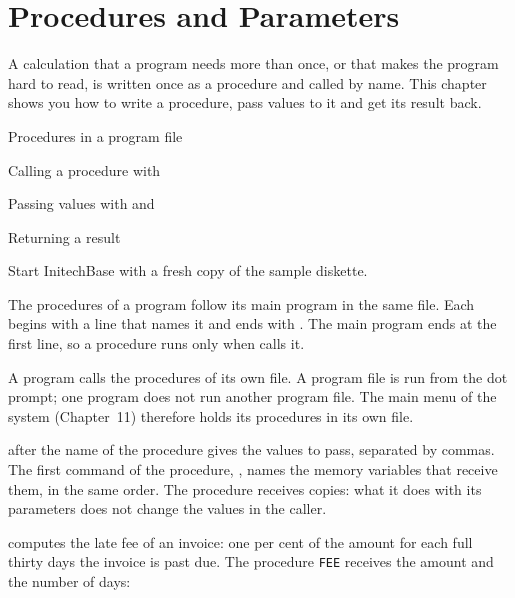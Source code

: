 \chapter{Procedures and Parameters}
A calculation that a program needs more than once, or that makes the program
hard to read, is written once as a procedure and called by name.  This chapter
shows you how to write a procedure, pass values to it and get its result back.

\begin{ChapterCovers}
\item Procedures in a program file
\item Calling a procedure with 
\item Passing values with  and 
\item Returning a result
\end{ChapterCovers}

Start InitechBase with a fresh copy of the sample diskette.

The procedures of a program follow its main program in the same file.  Each
begins with a  line that names it and ends with .
The main program ends at the first  line, so a procedure runs only
when  calls it.

A program calls the procedures of its own file.  A program file is run from the
dot prompt; one program does not run another program file.  The main menu of
the system (Chapter~11) therefore holds its procedures in its own file.

 after the name of the procedure gives the values to pass, separated by
commas.  The first command of the procedure, , names the memory
variables that receive them, in the same order.  The procedure receives copies:
what it does with its parameters does not change the values in the caller.

 computes the late fee of an invoice: one per cent of the
amount for each full thirty days the invoice is past due.  The procedure
\texttt{FEE} receives the amount and the number of days:

